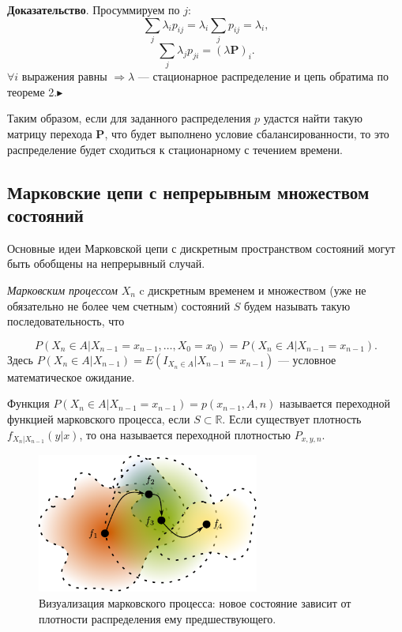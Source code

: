\documentclass[14pt,a4paper]{article}
\begin{document}
\textbf{Доказательство}. Просуммируем по $j$:
\begin{equation}
    \sum_j \lambda_i p_{i j} = \lambda_i \sum_j p_{i j} = \lambda_i,
\end{equation}
\begin{equation}
    \sum_j \lambda_j p_{j i} =  (\lambda \mathbf{P})_i.
\end{equation}
$\forall i$ выражения равны $\Rightarrow \lambda $ --- стационарное распределение и цепь обратима по теореме 2.$\blacktriangleright$
\[\] 

Таким образом, если для заданного распределения $p$ удастся найти такую матрицу перехода $\mathbf{P}$, что будет выполнено условие сбалансированности, то это распределение будет сходиться к стационарному с течением времени. 

\newpage
   \subsection{Марковские цепи с непрерывным множеством состояний}	
Основные идеи Марковской цепи с дискретным пространством состояний могут быть обобщены на непрерывный случай.


\textit{Марковским процессом} $X_n$ c дискретным временем и множеством (уже не обязательно не более чем счетным) состояний $S$ будем называть такую последовательность, что

\begin{equation}
P(X_n \in A|X_{n-1} = x_{n-1},\dots,X_{0}=x_{0}) = P(X_n \in  A|X_{n-1} = x_{n-1}).
\end{equation}
Здесь $P(X_n \in A|X_{n-1}) = E(I_{X_n \in A}|X_{n-1} = x_{n-1})$ — условное математическое ожидание. 


Функция $P(X_n \in A|X_{n-1} = x_{n-1}) = p(x_{n-1}, A, n)$ называется переходной функцией марковского процесса, если $S \subset \mathbb{R}$. Если существует плотность $f_{X_n|X_{n-1}}(y|x)$, то она называется переходной плотностью $P_{x, y, n}$. 

\begin{figure}[H]
    \centering
    \includegraphics[width=0.65\textwidth]{imgs/blujd1.pdf}
    \caption{Визуализация марковского процесса: новое состояние зависит от плотности распределения ему предшествующего.}
    \label{fig:my_label}
\end{figure}
\end{document}
